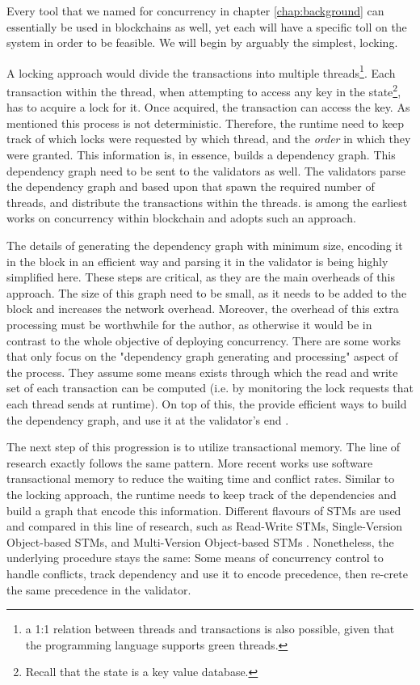 Every tool that we named for concurrency in chapter \ref{chap:background} can essentially be used in
blockchains as well, yet each will have a specific toll on the system in order to be feasible. We
will begin by arguably the simplest, locking.

A locking approach would divide the transactions into multiple threads\footnote{a 1:1 relation
between threads and transactions is also possible, given that the programming language supports
green threads.}. Each transaction within the thread, when attempting to access any key in the
state\footnote{Recall that the state is a key value database.}, has to acquire a lock for it. Once
acquired, the transaction can access the key. As mentioned this process is not deterministic.
Therefore, the runtime need to keep track of which locks were requested by which thread, and the
\textit{order} in which they were granted. This information is, in essence, builds a dependency
graph. This dependency graph need to be sent to the validators as well. The validators parse the
dependency graph and based upon that spawn the required number of threads, and distribute the
transactions within the threads. \cite{dickersonSmartLocksAddingConcurrency2017} is among the
earliest works on concurrency within blockchain and adopts such an approach.

The details of generating the dependency graph with minimum size, encoding it in the block in an
efficient way and parsing it in the validator is being highly simplified here. These steps are
critical, as they are the main overheads of this approach. The size of this graph need to be small,
as it needs to be added to the block and increases the network overhead. Moreover, the overhead of
this extra processing must be worthwhile for the author, as otherwise it would be in contrast to the
whole objective of deploying concurrency. There are some works that only focus on the "dependency
graph generating and processing" aspect of the process. They assume some means exists through which
the read and write set of each transaction can be computed (i.e. by monitoring the lock requests
that each thread sends at runtime). On top of this, the provide efficient ways to build the
dependency graph, and use it at the validator's end \cite{EnablingConcurrencySmart2018}.

The next step of this progression is to utilize transactional memory. The line of research exactly
follows the same pattern. More recent works use software transactional memory to reduce the waiting
time and conflict rates. Similar to the locking approach, the runtime needs to keep track of the
dependencies and build a graph that encode this information. Different flavours of STMs are used and
compared in this line of research, such as Read-Write STMs, Single-Version Object-based STMs, and
Multi-Version Object-based STMs
\cite{anjanaSTMEfficientConcurrent2019,anjanaSTMEfficientFramework2019}. Nonetheless, the underlying
procedure stays the same: Some means of concurrency control to handle conflicts, track dependency
and use it to encode precedence, then re-crete the same precedence in the validator.

